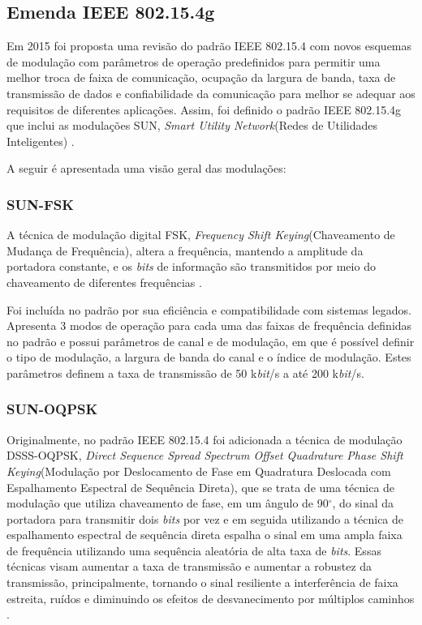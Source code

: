 \subsection*{Emenda IEEE 802.15.4g}
Em 2015 foi proposta uma revisão do padrão IEEE 802.15.4 com novos esquemas de modulação com parâmetros de operação predefinidos para permitir uma melhor troca de faixa de comunicação, ocupação da largura de banda, taxa de transmissão de dados e confiabilidade da comunicação para melhor se adequar aos requisitos de diferentes aplicações. Assim, foi definido o padrão IEEE 802.15.4g que inclui as modulações SUN, \emph{Smart Utility Network}(Redes de Utilidades Inteligentes) \cite{tuset2020reliability}.

A seguir é apresentada uma visão geral das modulações:

\subsubsection*{SUN-FSK}
A técnica de modulação digital FSK, \emph{Frequency Shift Keying}(Chaveamento de Mudança de Frequência), altera a frequência, mantendo a amplitude da portadora constante, e os \emph{bits} de informação são transmitidos por meio do chaveamento de diferentes frequências \cite{lathi2012}.

Foi incluída no padrão por sua eficiência e compatibilidade com sistemas legados. Apresenta 3 modos de operação para cada uma das faixas de frequência definidas no padrão e possui parâmetros de canal e de modulação, em que é possível definir o tipo de modulação, a largura de banda do canal e o índice de modulação. Estes parâmetros definem a taxa de transmissão de 50 k\emph{bit}/s a até 200 k\emph{bit}/s.

\subsubsection*{SUN-OQPSK}
Originalmente, no padrão IEEE 802.15.4 foi adicionada a técnica de modulação DSSS-OQPSK, \emph{Direct Sequence Spread Spectrum Offset Quadrature Phase Shift Keying}(Modulação por Deslocamento de Fase em Quadratura Deslocada com Espalhamento Espectral de Sequência Direta), que se trata de uma técnica de modulação que utiliza chaveamento de fase, em um ângulo de 90$^{\circ}$, do sinal da portadora para transmitir dois \emph{bits} por vez e em seguida utilizando a técnica de espalhamento espectral de sequência direta espalha o sinal em uma ampla faixa de frequência utilizando uma sequência aleatória de alta taxa de \emph{bits}. Essas técnicas visam aumentar a taxa de transmissão e aumentar a robustez da transmissão, principalmente, tornando o sinal resiliente a interferência de faixa estreita, ruídos e diminuindo os efeitos de desvanecimento por múltiplos caminhos \cite{goldsmith2005wireless}.

